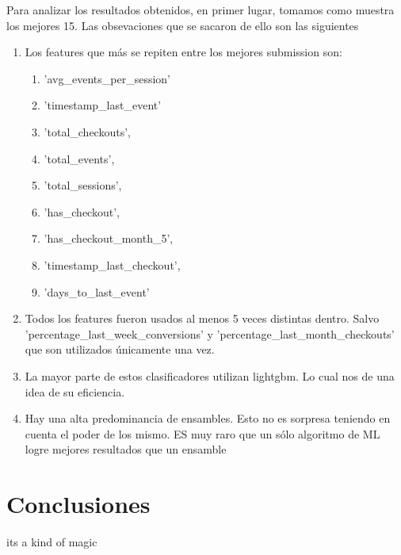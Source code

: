 \documentclass[a4paper]{article}
\begin{document}
Para analizar los resultados obtenidos, en primer lugar, tomamos como muestra los mejores 15. Las obsevaciones que se sacaron de ello son las siguientes
\begin{enumerate}
	\item Los features que más se repiten entre los mejores submission son:
	\begin{enumerate}
		\item 'avg\_events\_per\_session'
		\item 'timestamp\_last\_event'
		\item 'total\_checkouts',
		\item 'total\_events',
		\item 'total\_sessions',
		\item 'has\_checkout',
		\item 'has\_checkout\_month\_5',
		\item 'timestamp\_last\_checkout',
		\item 'days\_to\_last\_event'
	\end{enumerate}
	\item Todos los features fueron usados al menos 5 veces distintas dentro. Salvo 'percentage\_last\_week\_conversions' y 'percentage\_last\_month\_checkouts' que son utilizados únicamente una vez.
	\item La mayor parte de estos clasificadores utilizan lightgbm. Lo cual nos de una idea de su eficiencia.
	\item Hay una alta predominancia de ensambles. Esto no es sorpresa teniendo en cuenta el poder de los mismo. ES muy raro que un sólo algoritmo de ML logre mejores resultados que un ensamble
\end{enumerate}

\section{Conclusiones}
its a kind of magic
\end{document}
